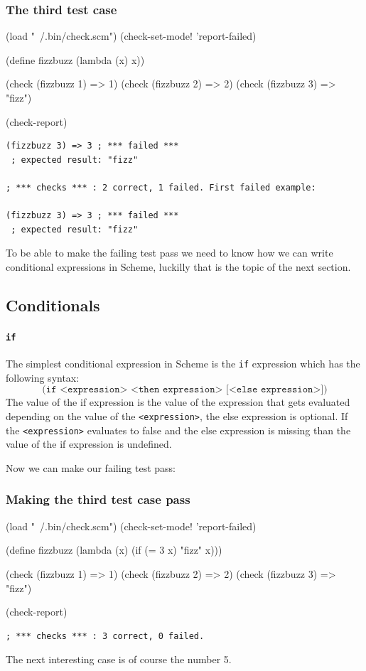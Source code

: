 \documentclass[12pt,a4paper,english,twoside]{article}
\begin{document}
\subsubsection{The third test case}
\begin{schemecode}
(load "~/.bin/check.scm")
(check-set-mode! 'report-failed)

(define fizzbuzz (lambda (x) x))

(check (fizzbuzz 1) => 1)
(check (fizzbuzz 2) => 2)
(check (fizzbuzz 3) => "fizz")

(check-report)
\end{schemecode}
\begin{lstlisting}
(fizzbuzz 3) => 3 ; *** failed ***
 ; expected result: "fizz"

; *** checks *** : 2 correct, 1 failed. First failed example:

(fizzbuzz 3) => 3 ; *** failed ***
 ; expected result: "fizz"
\end{lstlisting}

To be able to make the failing test pass we need to know how we can write 
conditional expressions in Scheme, luckilly that is the topic of the next 
section.

\subsection{Conditionals}
\paragraph{\texttt{if}}
The simplest conditional expression in Scheme is the \texttt{if} expression 
which
has the following syntax:
\begin{equation*}
    \texttt{(if <expression> <then expression> [<else expression>])}
\end{equation*}
The value of the if expression is the value of the expression that gets 
evaluated depending on the value of the \texttt{<expression>}, the else 
expression is optional. If the \texttt{<expression>} evaluates to false and 
the else expression is missing than the value of the if expression is 
undefined.

Now we can make our failing test pass:
\subsubsection{Making the third test case pass}
\begin{schemecode}
(load "~/.bin/check.scm")
(check-set-mode! 'report-failed)

(define fizzbuzz 
  (lambda (x) 
    (if (= 3 x) "fizz" x)))

(check (fizzbuzz 1) => 1)
(check (fizzbuzz 2) => 2)
(check (fizzbuzz 3) => "fizz")

(check-report)
\end{schemecode}
\begin{lstlisting}
; *** checks *** : 3 correct, 0 failed.
\end{lstlisting}
The next interesting case is of course the number 5.  
\end{document}

